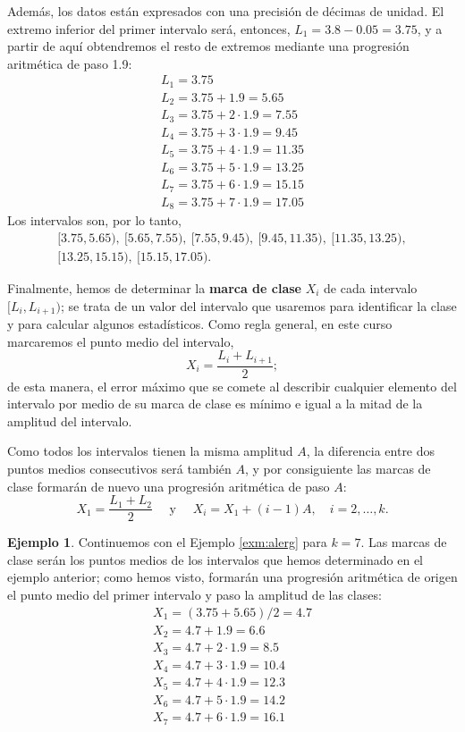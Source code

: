 \documentclass[
]{book}
\theoremstyle{definition}
\theoremstyle{definition}
\newtheorem{example}{Ejemplo}[chapter]
\theoremstyle{definition}
\theoremstyle{remark}
\begin{document}
Además, los datos están expresados con una precisión de décimas de unidad. El extremo inferior del primer intervalo será, entonces, \(L_1=3.8-0.05=3.75\), y a partir de aquí obtendremos el resto de extremos mediante una progresión aritmética de paso 1.9:
\[
\begin{array}{l}
L_1=3.75\\
L_2=3.75+1.9=5.65\\ 
L_3=3.75+2\cdot 1.9 = 7.55\\ 
L_4= 3.75+3\cdot 1.9 = 9.45\\ 
L_5= 3.75+4\cdot 1.9 = 11.35\\ 
L_6= 3.75+5\cdot 1.9 = 13.25\\
L_7= 3.75+6\cdot 1.9 = 15.15\\
 L_8= 3.75+7\cdot 1.9 = 17.05
\end{array}
\]
Los intervalos son, por lo tanto,
\[
\begin{array}{l}
[3.75,5.65),\ [5.65,7.55),\ [7.55,9.45),\ [9.45, 11.35),\ [11.35 ,13.25),\\{}
[13.25,15.15),\ [15.15,17.05).
\end{array}
\]

Finalmente, hemos de determinar la \textbf{marca de clase} \(X_i\) de cada intervalo \([L_i,L_{i+1})\); se trata de un valor del intervalo que usaremos para identificar la clase y para calcular algunos estadísticos. Como regla general, en este curso marcaremos el punto medio del intervalo,
\[
X_i=\frac{L_{i}+L_{i+1}}{2};
\]
de esta manera, el error máximo que se comete al describir cualquier elemento del intervalo por medio de su marca de clase es mínimo e igual a la mitad de la amplitud del intervalo.

Como todos los intervalos tienen la misma amplitud \(A\), la diferencia entre dos puntos medios consecutivos será también \(A\), y por consiguiente las marcas de clase formarán de nuevo una progresión aritmética de paso \(A\):
\[
X_1=\frac{L_1+L_2}{2}\quad \text{ y }\quad X_i=X_1+(i-1)A, \quad i=2,\ldots,k.
\]

\begin{example}
\protect\hypertarget{exm:unnamed-chunk-12}{}{\label{exm:unnamed-chunk-12} }Continuemos con el Ejemplo \ref{exm:alerg} para \(k=7\). Las marcas de clase serán los puntos medios de los intervalos que hemos determinado en el ejemplo anterior; como hemos visto, formarán una progresión aritmética de origen el punto medio del primer intervalo y paso la amplitud de las clases:
\[
\begin{array}{l}
X_1=(3.75+5.65)/2=4.7\\
X_2= 4.7 +1.9= 6.6\\
X_3= 4.7 + 2\cdot 1.9 = 8.5\\
X_4= 4.7 + 3\cdot 1.9= 10.4\\
X_5= 4.7 + 4\cdot 1.9= 12.3\\
X_6=4.7 + 5\cdot 1.9= 14.2\\
X_7= 4.7 + 6\cdot 1.9= 16.1
\end{array}
\]
\end{example}
\end{document}
